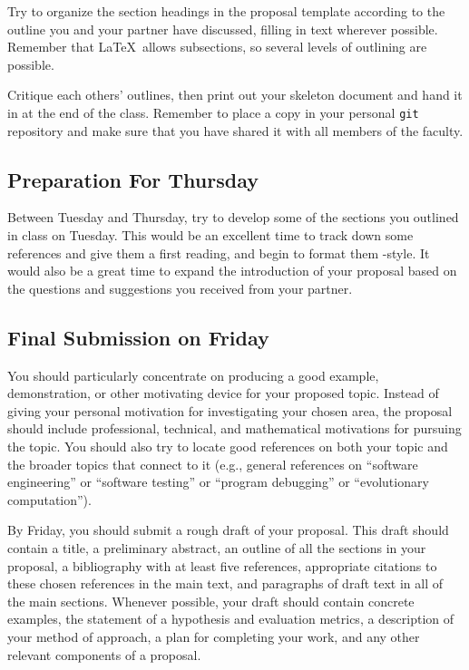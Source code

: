  Try to organize the section headings in the proposal template
according to the outline you and your partner have discussed, filling in text
wherever possible. Remember that \LaTeX\ allows subsections, so several
levels of outlining are possible.

 Critique each others' outlines, then print out your
skeleton document and hand it in at the end of the class. Remember to place a
copy in your personal {\tt git} repository and make sure that you have shared it
with all members of the faculty.

\subsection*{Preparation For Thursday}

Between Tuesday and Thursday, try to develop some of the sections you outlined in class on Tuesday. This would be an
excellent time to track down some references and give them a first reading, and begin to format them \BibTeX-style. It
would also be a great time to expand the introduction of your proposal based on the questions and suggestions you
received from your partner.

\subsection*{Final Submission on Friday}

You should particularly concentrate on producing a good example, demonstration, or other motivating device for your
proposed topic. Instead of giving your personal motivation for investigating your chosen area, the proposal should
include professional, technical, and mathematical motivations for pursuing the topic.  You should also try to locate
good references on both your topic and the broader topics that connect to it (e.g., general references on ``software
engineering'' or ``software testing'' or ``program debugging'' or ``evolutionary computation'').

By Friday, you should submit a rough draft of your proposal. This draft should contain a title, a preliminary abstract,
an outline of all the sections in your proposal, a bibliography with at least five references, appropriate citations to these
chosen references in the main text, and paragraphs of draft text in all of the main sections. Whenever possible, your
draft should contain concrete examples, the statement of a hypothesis and evaluation metrics, a description of
your method of approach, a plan for completing your work, and any other relevant components of a proposal.


